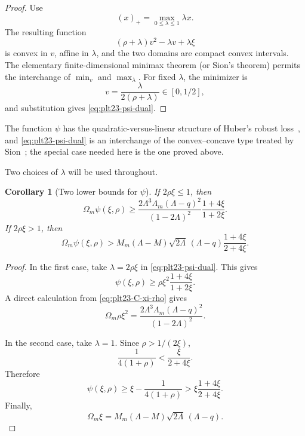 \documentclass[11pt]{article}
\newtheorem{corollary}[theorem]{Corollary}
\numberwithin{equation}{section}
\newcommand{\pos}[1]{\left(#1\right)_{+}}
\begin{document}
\begin{proof}
  Use
  \[
    \pos x=\max_{0\le\lambda\le1}\lambda x.
  \]
  The resulting function
  \[
    (\rho+\lambda)v^2-\lambda v+\lambda\xi
  \]
  is convex in $v$, affine in $\lambda$, and the two domains are compact
  convex intervals.  The elementary finite-dimensional minimax theorem (or
  Sion's theorem) permits the interchange of $\min_v$ and $\max_\lambda$.
  For fixed $\lambda$, the minimizer is
  \[
    v=\frac{\lambda}{2(\rho+\lambda)}\in[0,1/2],
  \]
  and substitution gives \eqref{eq:plt23-psi-dual}.
\end{proof}

The function $\psi$ has the quadratic-versus-linear structure of Huber's
robust loss~\cite{Huber1964}, and \eqref{eq:plt23-psi-dual} is an interchange of
the convex--concave type treated by Sion~\cite{Sion1958}; the special case
needed here is the one proved above.

Two choices of $\lambda$ will be used throughout.

\begin{corollary}[Two lower bounds for $\psi$]\label{cor:plt23-two-witnesses}
  If $2\rho\xi\le1$, then
  \begin{equation}\label{eq:plt23-witness-quadratic}
    \Omega_m\psi(\xi,\rho)
    \ge
    \frac{2\Lambda^3\Lambda_m(\Lambda-q)^2}{(1-2\Lambda)^2}
    \frac{1+4\xi}{1+2\xi}.
  \end{equation}
  If $2\rho\xi>1$, then
  \begin{equation}\label{eq:plt23-witness-linear}
    \Omega_m\psi(\xi,\rho)
    >M_m(\Lambda-M)\sqrt{2\Lambda}\,(\Lambda-q)
    \frac{1+4\xi}{2+4\xi}.
  \end{equation}
\end{corollary}

\begin{proof}
  In the first case, take $\lambda=2\rho\xi$ in
  \eqref{eq:plt23-psi-dual}.  This gives
  \[
    \psi(\xi,\rho)\ge
    \rho\xi^2\frac{1+4\xi}{1+2\xi}.
  \]
  A direct calculation from \eqref{eq:plt23-C-xi-rho} gives
  \[
    \Omega_m\rho\xi^2=\frac{2\Lambda^3\Lambda_m(\Lambda-q)^2}{(1-2\Lambda)^2}.
  \]

  In the second case, take $\lambda=1$.  Since
  $\rho>1/(2\xi)$,
  \[
    \frac{1}{4(1+\rho)}<\frac{\xi}{2+4\xi}.
  \]
  Therefore
  \[
    \psi(\xi,\rho)
    \ge\xi-\frac{1}{4(1+\rho)}
    >\xi\frac{1+4\xi}{2+4\xi}.
  \]
  Finally,
  \[
    \Omega_m\xi=M_m(\Lambda-M)\sqrt{2\Lambda}\,(\Lambda-q).
  \]
\end{proof}
\end{document}
